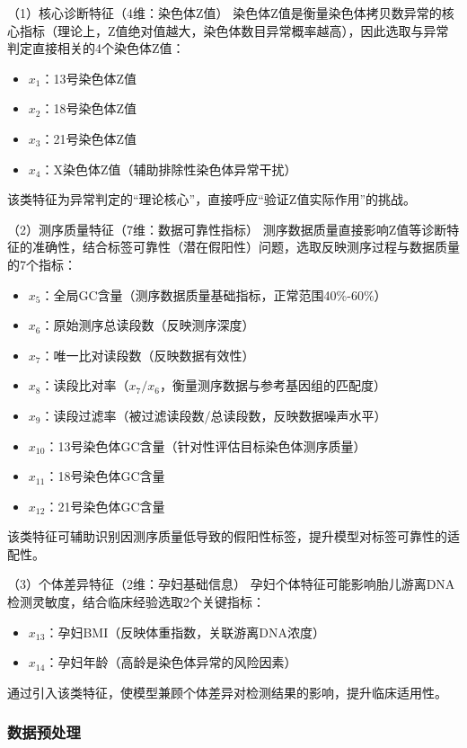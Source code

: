 \documentclass[withoutpreface,bwprint]{cumcmthesis} %
\begin{document}
（1）核心诊断特征（4维：染色体Z值）  
染色体Z值是衡量染色体拷贝数异常的核心指标（理论上，Z值绝对值越大，染色体数目异常概率越高），因此选取与异常判定直接相关的4个染色体Z值：  
\begin{itemize}
    \item \quad $ x_1 $：13号染色体Z值  
    \item \quad $ x_2 $：18号染色体Z值  
    \item \quad $ x_3 $：21号染色体Z值  
    \item \quad $ x_4 $：X染色体Z值（辅助排除性染色体异常干扰）  
\end{itemize}

该类特征为异常判定的“理论核心”，直接呼应“验证Z值实际作用”的挑战。

（2）测序质量特征（7维：数据可靠性指标）  
测序数据质量直接影响Z值等诊断特征的准确性，结合标签可靠性（潜在假阳性）问题，选取反映测序过程与数据质量的7个指标：  
\begin{itemize}
    \item $ x_5 $：全局GC含量（测序数据质量基础指标，正常范围40\%-60\%）
    \item $ x_6 $：原始测序总读段数（反映测序深度）
    \item $ x_7 $：唯一比对读段数（反映数据有效性）
    \item $ x_8 $：读段比对率（$ x_7/x_6 $，衡量测序数据与参考基因组的匹配度）
    \item $ x_9 $：读段过滤率（被过滤读段数/总读段数，反映数据噪声水平）
    \item $ x_{10} $：13号染色体GC含量（针对性评估目标染色体测序质量）
    \item $ x_{11} $：18号染色体GC含量
    \item $ x_{12} $：21号染色体GC含量
\end{itemize}
  
该类特征可辅助识别因测序质量低导致的假阳性标签，提升模型对标签可靠性的适配性。

（3）个体差异特征（2维：孕妇基础信息）  
孕妇个体特征可能影响胎儿游离DNA检测灵敏度，结合临床经验选取2个关键指标：  
\begin{itemize}
    \item $ x_{13} $：孕妇BMI（反映体重指数，关联游离DNA浓度）
    \item $ x_{14} $：孕妇年龄（高龄是染色体异常的风险因素）
\end{itemize}

通过引入该类特征，使模型兼顾个体差异对检测结果的影响，提升临床适用性。

\subsubsection{数据预处理}
\end{document}
